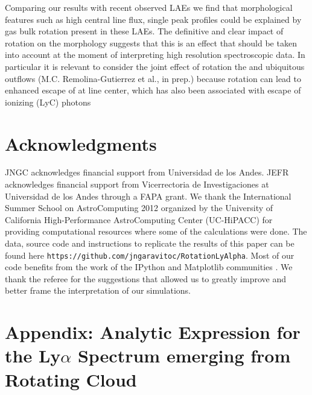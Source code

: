 Comparing our results with recent observed LAEs we find that
morphological features such as high central line flux, single peak
profiles could be explained by gas bulk rotation present in these
LAEs.
The definitive and clear impact of rotation on the \ly morphology
suggests that this is an effect that should be taken into account at
the moment of interpreting high resolution spectroscopic data. In
particular it is relevant to consider the joint effect of rotation the
and ubiquitous outflows (M.C. Remolina-Gutierrez et al., in prep.)
because rotation can lead to enhanced escape of \ly at line center, which
has also been associated with escape of ionizing (LyC) photons
\citep{Behrens2014,2014arXiv1404.2958V}
\section*{Acknowledgments}
JNGC acknowledges financial support from Universidad de los
Andes.
JEFR acknowledges financial support from Vicerrectoria de
Investigaciones at Universidad de los Andes through a FAPA grant.
We thank the International Summer School on AstroComputing
2012 organized by the University of California High-Performance
AstroComputing Center (UC-HiPACC) for providing computational
resources where some of the calculations were done.
The data, source code and instructions to
replicate the results of this paper can be found
here {\texttt{https://github.com/jngaravitoc/RotationLyAlpha}}.
Most of our code benefits from the work of the IPython and Matplotlib
communities \citep{IPython,matplotlib}.
We thank the referee for the suggestions that allowed us to greatly
improve and better frame the interpretation of our simulations.
\appendix

\section{Appendix: Analytic Expression for the Ly$\alpha$ Spectrum
emerging from Rotating Cloud}\label{sec:app}




